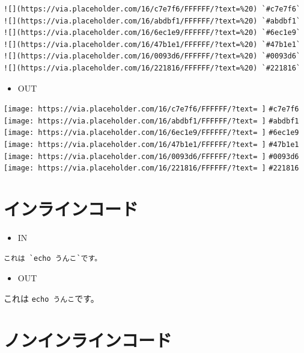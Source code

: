 \documentclass[]{article}
\begin{document}
\begin{verbatim}
![](https://via.placeholder.com/16/c7e7f6/FFFFFF/?text=%20) `#c7e7f6`
![](https://via.placeholder.com/16/abdbf1/FFFFFF/?text=%20) `#abdbf1`
![](https://via.placeholder.com/16/6ec1e9/FFFFFF/?text=%20) `#6ec1e9`
![](https://via.placeholder.com/16/47b1e1/FFFFFF/?text=%20) `#47b1e1`
![](https://via.placeholder.com/16/0093d6/FFFFFF/?text=%20) `#0093d6`
![](https://via.placeholder.com/16/221816/FFFFFF/?text=%20) `#221816`
\end{verbatim}

\begin{itemize}
\item
  OUT
\end{itemize}

\texttt{[image: https://via.placeholder.com/16/c7e7f6/FFFFFF/?text= ]}
\texttt{\#c7e7f6}\\
\texttt{[image: https://via.placeholder.com/16/abdbf1/FFFFFF/?text= ]}
\texttt{\#abdbf1}\\
\texttt{[image: https://via.placeholder.com/16/6ec1e9/FFFFFF/?text= ]}
\texttt{\#6ec1e9}\\
\texttt{[image: https://via.placeholder.com/16/47b1e1/FFFFFF/?text= ]}
\texttt{\#47b1e1}\\
\texttt{[image: https://via.placeholder.com/16/0093d6/FFFFFF/?text= ]}
\texttt{\#0093d6}\\
\texttt{[image: https://via.placeholder.com/16/221816/FFFFFF/?text= ]}
\texttt{\#221816}

\section{インラインコード}\label{header-n244}

\begin{itemize}
\item
  IN
\end{itemize}

\begin{verbatim}
これは `echo うんこ`です。
\end{verbatim}

\begin{itemize}
\item
  OUT
\end{itemize}

これは \texttt{echo\ うんこ}です。

\section{ノンインラインコード}\label{header-n254}
\end{document}
